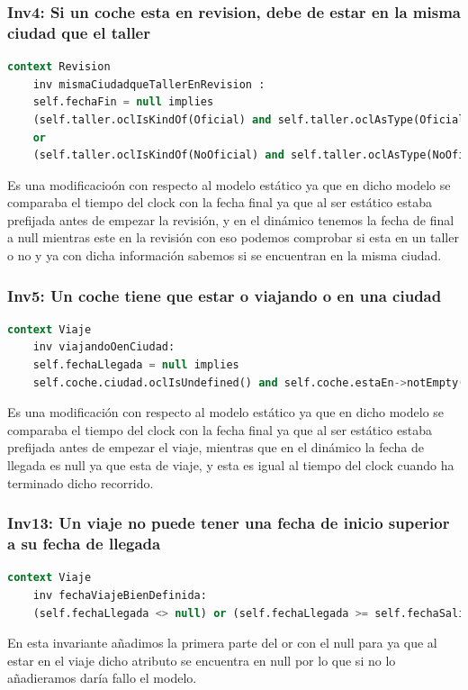 \documentclass[12pt.a4paper]{article}
\begin{document}
\subsubsection{Inv4: Si un coche esta en revision, debe de estar en la misma ciudad que el taller}
    \begin{lstlisting}[style = useEspecifico,language=SQL]
context Revision
    inv mismaCiudadqueTallerEnRevision :
    self.fechaFin = null implies 
    (self.taller.oclIsKindOf(Oficial) and self.taller.oclAsType(Oficial).ciudad = self.coche.ciudad)
    or
    (self.taller.oclIsKindOf(NoOficial) and self.taller.oclAsType(NoOficial).ciudad = self.coche.ciudad)
    \end{lstlisting}
    Es una modificacioón con respecto al modelo estático ya que en dicho modelo se comparaba el tiempo del clock con la fecha final ya que al ser estático estaba prefijada antes de empezar la revisión, y en el dinámico tenemos la fecha de final a null mientras este en la revisión con eso podemos comprobar si esta en un taller o no y ya con dicha información sabemos si se encuentran en la misma ciudad.

\subsubsection{Inv5: Un coche tiene que estar o viajando o en una ciudad}
    \begin{lstlisting}[style = useEspecifico,language=SQL]
context Viaje
    inv viajandoOenCiudad:
    self.fechaLlegada = null implies
    self.coche.ciudad.oclIsUndefined() and self.coche.estaEn->notEmpty()
    \end{lstlisting}
    Es una modificación con respecto al modelo estático ya que en dicho modelo se comparaba el tiempo del clock con la fecha final ya que al ser estático estaba prefijada antes de empezar el viaje, mientras que en el dinámico la fecha de llegada es null ya que esta de viaje, y esta es igual al tiempo del clock cuando ha terminado dicho recorrido.


\subsubsection{Inv13: Un viaje no puede tener una fecha de inicio superior a su fecha de llegada}
    \begin{lstlisting}[style = useEspecifico,language=SQL]
context Viaje
    inv fechaViajeBienDefinida:
    (self.fechaLlegada <> null) or (self.fechaLlegada >= self.fechaSalida)
    \end{lstlisting}
    En esta invariante añadimos la primera parte del or con el null para ya que al estar en el viaje dicho atributo se encuentra en null por lo que si no lo añadieramos daría fallo el modelo.
\end{document}
